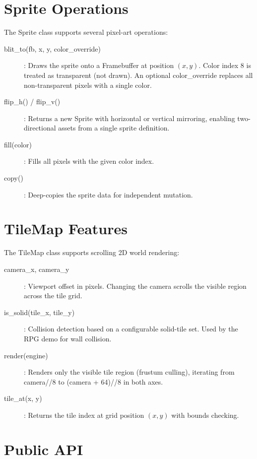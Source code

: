 \documentclass[12pt,a4paper,twoside]{book}
\theoremstyle{trinarytheorem}
\theoremstyle{trinarydefinition}
\newcommand{\code}[1]{\textsf{#1}}
\begin{document}
\section{Sprite Operations}

The \code{Sprite} class supports several pixel-art operations:
\begin{description}
    \item[\code{blit\_to(fb, x, y, color\_override)}]: Draws the sprite onto a
          \code{Framebuffer} at position $(x, y)$. Color index 8 is treated as
          transparent (not drawn). An optional \code{color\_override} replaces
          all non-transparent pixels with a single color.
    \item[\code{flip\_h()} / \code{flip\_v()}]: Returns a new \code{Sprite}
          with horizontal or vertical mirroring, enabling two-directional assets
          from a single sprite definition.
    \item[\code{fill(color)}]: Fills all pixels with the given color index.
    \item[\code{copy()}]: Deep-copies the sprite data for independent mutation.
\end{description}

\section{TileMap Features}

The \code{TileMap} class supports scrolling 2D world rendering:
\begin{description}
    \item[\code{camera\_x, camera\_y}]: Viewport offset in pixels. Changing
          the camera scrolls the visible region across the tile grid.
    \item[\code{is\_solid(tile\_x, tile\_y)}]: Collision detection based on a
          configurable solid-tile set. Used by the RPG demo for wall collision.
    \item[\code{render(engine)}]: Renders only the visible tile region
          (frustum culling), iterating from \code{camera//8} to
          \code{(camera + 64)//8} in both axes.
    \item[\code{tile\_at(x, y)}]: Returns the tile index at grid position
          $(x, y)$ with bounds checking.
\end{description}

\section{Public API}
\end{document}
